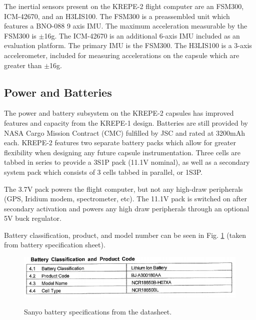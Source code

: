 \documentclass{article}
\begin{document}
The inertial sensors present on the KREPE-2 flight computer are an FSM300, ICM-42670, and an H3LIS100. The FSM300 is a preassembled unit which features a BNO-088 9 axis IMU. The maximum acceleration measurable by the FSM300 is $\pm$16g. The ICM-42670 is an additional 6-axis IMU included as an evaluation platform. The primary IMU is the FSM300. The H3LIS100 is a 3-axis accelerometer, included for measuring accelerations on the capsule which are greater than $\pm$16g.




\subsection{Power and Batteries}

The power and battery subsystem on the KREPE-2 capsules has improved features and capacity from the KREPE-1 design. Batteries are still provided by NASA Cargo Mission Contract (CMC) fulfilled by JSC and rated at 3200mAh each. KREPE-2 features two separate battery packs which allow for greater flexibility when designing any future capsule instrumentation. Three cells are tabbed in series to provide a 3S1P pack (11.1V nominal), as well as a secondary system pack which consists of 3 cells tabbed in parallel, or 1S3P. %

The 3.7V pack powers the flight computer, but not any high-draw peripherals (GPS, Iridium modem, spectrometer, etc). The 11.1V pack is switched on after secondary activation and powers any high draw peripherals through an optional 5V buck regulator. 

Battery classification, product, and model number can be seen in Fig. \ref{fig:bat-spec} (taken from battery specification sheet).

\begin{figure}[h!]
	\centering
	\includegraphics[width=12cm]{images/battery-spec.png}
	\label{fig:bat-spec}
	\caption{Sanyo battery specifications from the datasheet.}
\end{figure}
\end{document}
